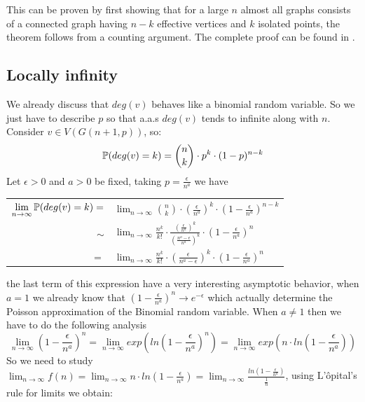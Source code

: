  This can be proven by first showing that for a large $n$ almost all graphs consists of a connected graph having $n-k$ effective vertices and $k$ isolated points, the theorem follows from a counting argument. The complete proof can be found in \cite[Erdös-Rényi, 59]{OnRandomGraphs}.
 
 
\subsection{Locally infinity}

We already discuss that $deg(v)$ behaves like a binomial random variable. So we just have to describe $p$ so that a.a.s $deg(v)$ tends to infinite along with $n$. Consider $v\in V(G(n+1,p))$, so:
$$ \P(deg(v)=k) = \binom{n}{k} \cdot p^{k} \cdot (1-p)^{n-k}$$
Let $\epsilon>0$ and $a>0$ be fixed, taking $p=\frac{\epsilon}{n^{a}}$ we have
\begin{center}
\begin{tabular}{ r l }
 $\displaystyle\lim_{n\to \infty } \P(deg(v)=k) =$ & $\displaystyle\lim_{n\to \infty} \binom{n}{k} \cdot \left( \frac{\epsilon}{n^a} \right)^k \cdot \left( 1-\frac{\epsilon}{n^a}\right)^{n-k}$ \\
 $\sim$ &  $\displaystyle\lim_{n\to \infty} \frac{n^k}{k!}\cdot  \frac{\left(\frac{\epsilon}{n^a}\right)^k} {\left(\frac{n^a - \epsilon}{n^a}\right)^k} \cdot \left(1-\frac{\epsilon}{n^a}\right)^{n} $\\
$=$ &  $\displaystyle\lim_{n\to \infty} \frac{n^k}{k!}\cdot \left(\frac{\epsilon} {n^a - \epsilon}\right)^k \cdot \left(1-\frac{\epsilon}{n^a}\right)^{n} $\\
\end{tabular}
\end{center}
the last term of this expression have a very interesting asymptotic behavior, when $a=1$ we already know that $\left(1-\frac{\epsilon}{n^a}\right)^{n} \to e^{-\epsilon}$ which actually determine the Poisson approximation of the Binomial random variable. When $a\neq 1$ then we have to do the following analysis
$$\displaystyle\lim_{n\to \infty } \left( 1 - \frac{\epsilon}{n^a}\right)^n = \displaystyle\lim_{n\to \infty} exp\left( ln \left( 1 - \frac{\epsilon}{n^a}\right)^n\right) = \displaystyle\lim_{n\to \infty} exp\left(n \cdot ln \left( 1 - \frac{\epsilon}{n^a}\right)\right)$$
So we need to study $\displaystyle\lim_{n\to \infty} f(n) = \displaystyle\lim_{n\to \infty} n \cdot ln \left( 1 - \frac{\epsilon}{n^a}\right)= \displaystyle\lim_{n\to \infty}\frac{ln \left( 1 - \frac{\epsilon}{n^a}\right)}{\frac{1}{n}}$, using L'ôpital's rule for limits we obtain:
